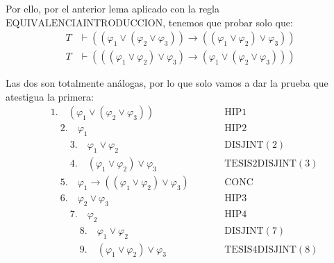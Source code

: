 \documentclass{article}
\begin{document}
Por ello, por el anterior lema aplicado con la regla $\text{EQUIVALENCIAINTRODUCCION}$, tenemos que probar solo que:
\begin{equation*}
  \begin{aligned}
    T & \vdash((\varphi_1\lor(\varphi_2\lor\varphi_3))\to((\varphi_1\lor\varphi_2)\lor\varphi_3)) \\
    T & \vdash(((\varphi_1\lor\varphi_2)\lor\varphi_3)\to(\varphi_1\lor(\varphi_2\lor\varphi_3)))
  \end{aligned}
\end{equation*}

Las dos son totalmente análogas, por lo que solo vamos a dar la prueba que atestigua la primera:
\begin{equation*}
  \begin{alignedat}{2}
     & 1. \quad (\varphi_1\lor(\varphi_2\lor\varphi_3))                                                  &  & \qquad\text{HIP}1                              \\
     & \quad 2. \quad \varphi_1                                                                          &  & \qquad\text{HIP}2                              \\
     & \qquad 3. \quad \varphi_1\lor\varphi_2                                                            &  & \qquad\text{DISJINT}(2)                        \\
     & \qquad 4. \quad (\varphi_1\lor\varphi_2)\lor\varphi_3                                             &  & \qquad\text{TESIS}2\text{DISJINT}(3)           \\
     & \quad 5. \quad \varphi_1\to((\varphi_1\lor\varphi_2)\lor\varphi_3)                                &  & \qquad\text{CONC}                              \\
     & \quad 6. \quad \varphi_2\lor\varphi_3                                                             &  & \qquad\text{HIP}3                              \\
     & \qquad 7. \quad \varphi_2                                                                         &  & \qquad\text{HIP}4                              \\
     & \qquad\quad 8. \quad \varphi_1\lor\varphi_2                                                       &  & \qquad\text{DISJINT}(7)                        \\
     & \qquad\quad 9. \quad (\varphi_1\lor\varphi_2)\lor\varphi_3                                        &  & \qquad\text{TESIS}4\text{DISJINT}(8)           \\

\end{alignedat}
\end{equation*}
\end{document}
